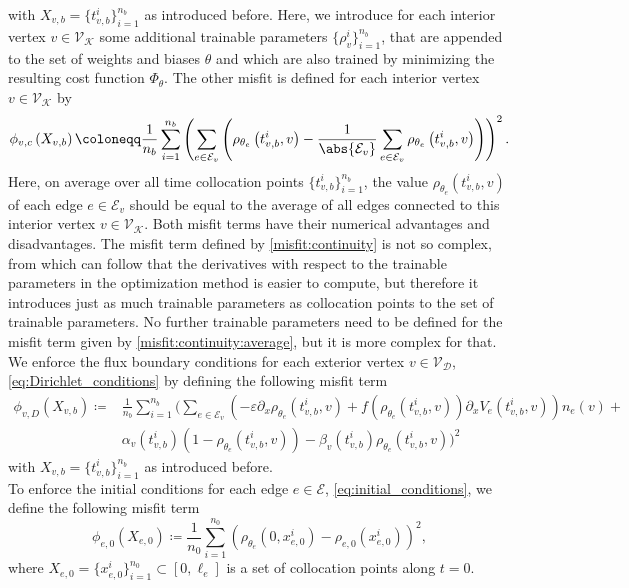 with $X_{v,b} = \{t_{v,b}^i\}_{i=1}^{n_b}$ as introduced before. Here, we introduce for each interior vertex $v \in \mathcal{V}_\mathcal{K}$ some additional trainable parameters $\{\rho_{v}^i\}_{i=1}^{n_b}$, that are appended to the set of weights and biases $\theta$ and which are also trained by minimizing the resulting cost function $\Phi_\theta$. The other misfit is defined for each interior vertex $v \in \mathcal{V}_\mathcal{K}$ by 
\begin{equation} 
    \label{misfit:continuity:average}
    \phi_{v,c}  \left( X_{v,b} \right) \coloneqq \frac{1}{n_b}  \sum_{i=1}^{n_b} \left( \sum_{e \in \mathcal{E}_v} \left( \rho_{\theta_e}  \left( t_{v,b}^i, v \right) - \frac{1}{\abs{\mathcal{E}_v}} \sum_{e \in \mathcal{E}_v} \rho_{\theta_e}  \left( t_{v,b}^i, v \right) \right) \right)^2.
\end{equation}
Here, on average over all time collocation points $\{t_{v,b}^i\}_{i=1}^{n_b}$, the value $\rho_{\theta_e}  \left( t_{v,b}^i, v \right)$ of each edge $e \in \mathcal{E}_v$ should be equal to the average of all edges connected to this interior vertex $v \in \mathcal{V}_\mathcal{K}$. Both misfit terms have their numerical advantages and disadvantages. The misfit term defined by \cref{misfit:continuity} is not so complex, from which can follow that the derivatives with respect to the trainable parameters in the optimization method is easier to compute, but therefore it introduces just as much trainable parameters as collocation points to the set of trainable parameters. No further trainable parameters need to be defined for the misfit term given by \cref{misfit:continuity:average}, but it is more complex for that. \\
We enforce the flux boundary conditions for each exterior vertex $v \in \mathcal{V}_\mathcal{D}$, \cref{eq:Dirichlet_conditions} by defining the following misfit term  
\begin{align} 
    \label{misfit:Dirichlet}
    \phi_{v,D}  \left( X_{v,b} \right) \coloneqq & \frac{1}{n_b} \sum_{i=1}^{n_b} \bigg( \sum_{e \in \mathcal{E}_v} \left(- \varepsilon \partial_x \rho_{\theta_e}  \left( t_{v,b}^i, v \right) + f\left(\rho_{\theta_e}  \left( t_{v,b}^i, v \right)\right) \partial_x V_e\left( t_{v,b}^i, v \right) \right) n_e  \left( v \right) + \\
    & \alpha_v \left( t_{v,b}^i \right)  \left( 1- \rho_{\theta_e}  \left( t_{v,b}^i, v \right) \right) - \beta_v \left( t_{v,b}^i \right) \rho_{\theta_e}  \left( t_{v,b}^i, v \right) \bigg)^2
\end{align}
with $X_{v,b} = \{t_{v,b}^i\}_{i=1}^{n_b}$ as introduced before. \\
To enforce the initial conditions for each edge $e \in \mathcal{E}$, \cref{eq:initial_conditions}, we define the following misfit term  
\begin{equation} 
    \label{misfit:initial}
    \phi_{e,0}  \left( X_{e,0} \right) \coloneqq \frac{1}{n_0} \sum_{i=1}^{n_0}  \left( \rho_{\theta_e}  \left( 0,x_{e,0}^i \right) - \rho_{e,0} \left( x_{e,0}^i \right) \right)^2, 
\end{equation} 
where $X_{e,0} = \{x_{e,0}^i\}_{i=1}^{n_0} \subset [0, \ell_e]$ is a set of collocation points along $t=0$. \\ 

